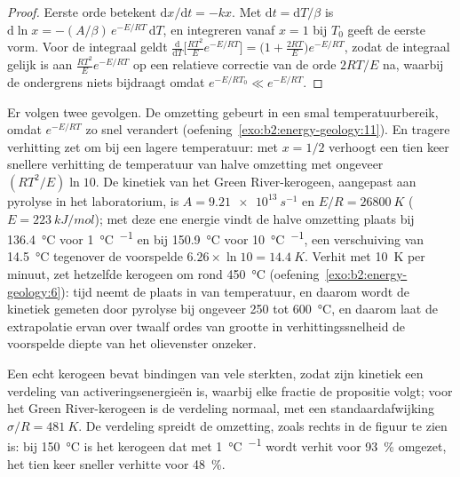 \begin{proof}
Eerste orde betekent $\mathrm{d}x/\mathrm{d}t = -k x$. Met $\mathrm{d}t = \mathrm{d}T/\beta$ is
$\mathrm{d}\ln x = -(A/\beta)\,e^{-E/RT}\,\mathrm{d}T$, en integreren vanaf $x = 1$ bij $T_0$ geeft
de eerste vorm. Voor de integraal geldt $\frac{\mathrm{d}}{\mathrm{d}T}\bigl[\frac{RT^2}{E}e^{-E/RT}\bigr]
= \bigl(1 + \frac{2RT}{E}\bigr)e^{-E/RT}$, zodat de integraal gelijk is aan $\frac{RT^2}{E}e^{-E/RT}$ op een
relatieve correctie van de orde $2RT/E$ na, waarbij de ondergrens niets bijdraagt omdat $e^{-E/RT_0} \ll
e^{-E/RT}$.
\end{proof}

Er volgen twee gevolgen. De omzetting gebeurt in een smal temperatuurbereik, omdat
$e^{-E/RT}$ zo snel verandert (oefening~\ref{exo:b2:energy-geology:11}). En tragere verhitting zet om
bij een lagere temperatuur: met $x = 1/2$ verhoogt een tien keer snellere verhitting de temperatuur van
halve omzetting met ongeveer $(RT^2/E)\ln 10$. De kinetiek van het Green River-kerogeen, aangepast aan
pyrolyse in het laboratorium, is $A = \qty{9.21e13}{s^{-1}}$ en $E/R = \qty{26800}{K}$ ($E =
\qty{223}{kJ/mol}$); met deze ene energie vindt de halve omzetting plaats bij \qty{136.4}{\celsius} voor
\qty{1}{\celsius\per\Myr} en bij \qty{150.9}{\celsius} voor \qty{10}{\celsius\per\Myr}, een verschuiving van
\qty{14.5}{\celsius} tegenover de voorspelde $6.26 \times \ln 10 = \qty{14.4}{K}$. Verhit met
\qty{10}{K} per minuut, zet hetzelfde kerogeen om rond \qty{450}{\celsius}
(oefening~\ref{exo:b2:energy-geology:6}): tijd neemt de plaats in van temperatuur, en daarom wordt de kinetiek
gemeten door pyrolyse bij ongeveer 250 tot \qty{600}{\celsius}, en daarom laat de extrapolatie ervan over twaalf
ordes van grootte in verhittingssnelheid de voorspelde diepte van het olievenster onzeker.

Een echt kerogeen bevat bindingen van vele sterkten, zodat zijn kinetiek een verdeling van
activeringsenergieën is, waarbij elke fractie de propositie volgt; voor het Green River-kerogeen is de verdeling
normaal, met een standaardafwijking $\sigma/R = \qty{481}{K}$. De verdeling spreidt de
omzetting, zoals rechts in de figuur te zien is: bij \qty{150}{\celsius} is het kerogeen dat met
\qty{1}{\celsius\per\Myr} wordt verhit voor \qty{93}{\percent} omgezet, het tien keer sneller verhitte voor
\qty{48}{\percent}.

